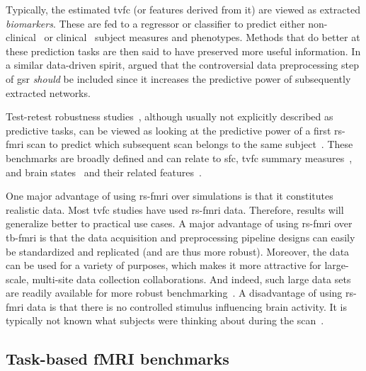 Typically, the estimated \gls{tvfc} (or features derived from it) are viewed as extracted \emph{biomarkers}.
These are fed to a regressor or classifier to predict either non-clinical~\parencite[see e.g.][]{Taghia2017, Li2019a} or clinical~\parencite[see e.g.][]{Filippi2019, Du2021} subject measures and phenotypes.
Methods that do better at these prediction tasks are then said to have preserved more useful information.
%
In a similar data-driven spirit, \textcite{Li2019a} argued that the controversial data preprocessing step of \gls{gsr} \emph{should} be included since it increases the predictive power of subsequently extracted networks.

Test-retest robustness studies~\parencite{Noble2019}, although usually not explicitly described as predictive tasks, can be viewed as looking at the predictive power of a first \gls{rs-fmri} scan to predict which subsequent scan belongs to the same subject~\parencite{Fiecas2013, Choe2017, Abrol2017, Zhang2018, Elliott2020}.
These benchmarks are broadly defined and can relate to \gls{sfc}, \gls{tvfc} summary measures~\parencite{Abrol2017, Choe2017}, and brain states~\parencite{Abrol2016} and their related features~\parencite{Abrol2017}.

One major advantage of using \gls{rs-fmri} over simulations is that it constitutes realistic data.
Most \gls{tvfc} studies have used \gls{rs-fmri} data.
Therefore, results will generalize better to practical use cases.
%
A major advantage of using \gls{rs-fmri} over \gls{tb-fmri} is that the data acquisition and preprocessing pipeline designs can easily be standardized and replicated (and are thus more robust).
Moreover, the data can be used for a variety of purposes, which makes it more attractive for large-scale, multi-site data collection collaborations.
And indeed, such large data sets are readily available for more robust benchmarking~\parencite[see e.g.][]{VanEssen2012, Allen2014b}.
%
A disadvantage of using \gls{rs-fmri} data is that there is no controlled stimulus influencing brain activity.
It is typically not known what subjects were thinking about during the scan~\parencite[see also][]{Finn2021}.

\subsection{Task-based fMRI benchmarks}

